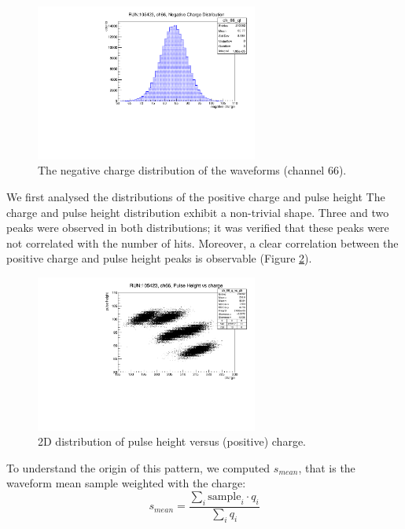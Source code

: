 \begin{figure}[!h]
    \centering
    \includegraphics[width=0.65\textwidth]{figures/pdf/negcharge.pdf}
    \caption[The negative charge distribution of the waveforms.]{The negative charge distribution of the waveforms (channel 66).}
    \label{fig:nch2}
\end{figure}
We first analysed the distributions 
of the positive charge and pulse height   
The charge and pulse height distribution 
exhibit a non-trivial shape. 
Three and two peaks were observed in both distributions; 
it was verified that 
these peaks were not correlated with 
the number of hits. Moreover, a clear
correlation between the positive charge and pulse 
height peaks is observable (Figure \ref{fig:chvsph}). 
\begin{figure}[!h]
  \centering
  \includegraphics[width=0.65\textwidth]{figures/pdf/phch1.pdf}
  \caption[The 2D distribution of pulse height versus (positive) charge.]{2D distribution of pulse height versus (positive) charge.}
  \label{fig:chvsph}
\end{figure}
To understand the origin of this pattern, we computed $s_{mean}$, 
that is the 
waveform mean sample weighted with the charge: 
\begin{equation} 
  s_{mean} = \frac{\sum_i \text{sample}_i \cdot q_i }{\sum_i q_i} 
\end{equation}
